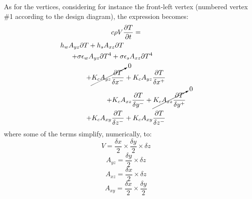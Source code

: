 \documentclass[a4paper,10pt]{IEEEtran}
\begin{document}
	As for the vertices, considering for instance the front-left vertex (numbered vertex \#1 according to the design diagram), the expression becomes:
	\begin{multline}
	c \rho V \frac{\partial T}{\partial t} = \\
	h_w A_{yz}\partial T + h_s A_{xz}\partial T \qquad \qquad \qquad \qquad \qquad\\
	+ \sigma \epsilon_w A_{yz}\partial T^4 + \sigma \epsilon_s A_{xz}\partial T^4 \qquad \qquad\\
	+ \cancelto{0}{K_c A_{yz}\frac{\partial T}{\delta x^-}} + K_c A_{yz}\frac{\partial T}{\delta x^+} \\
	\qquad \qquad \qquad + K_c A_{xz}\frac{\partial T}{\delta y^-} + \cancelto{0}{K_c A_{xz}\frac{\partial T}{\delta y^+}}\\
	+ K_c A_{xy}\frac{\partial T}{\delta z^-} + K_c A_{xy}\frac{\partial T}{\delta z^-}
	\end{multline}
	where some of the terms simplify, numerically, to:
	$$V = \frac{\delta x}{2} \times \frac{\delta y}{2} \times \delta z $$
	$$A_{yz} = \frac{\delta y}{2} \times \delta z $$
	$$A_{xz} = \frac{\delta x}{2} \times \delta z $$
	$$A_{xy} = \frac{\delta x}{2} \times \frac{\delta y}{2} $$
	
\end{document}

